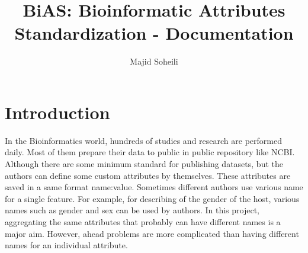 \documentclass[11pt]{article}
\begin{document}
    \title{BiAS: Bioinformatic Attributes Standardization - Documentation}
    \author{Majid Soheili}
    \maketitle

    \section{Introduction}\label{sec:intro}
    In the Bioinformatics world, hundreds of studies and research are performed daily.
    Most of them prepare their data to public in public repository like NCBI.\@
    Although there are some minimum standard for publishing datasets, but the authors can define some custom attributes by themselves.
    These attributes are saved in a same format {name:value}.
    Sometimes different authors use various name for a single feature.
    For example, for describing of the gender of the host, various names such as gender and sex can be used by authors.
    In this project, aggregating the same attributes that probably can have different names is a major aim.
    However, ahead problems are more complicated than having different names for an individual attribute.
\end{document}
